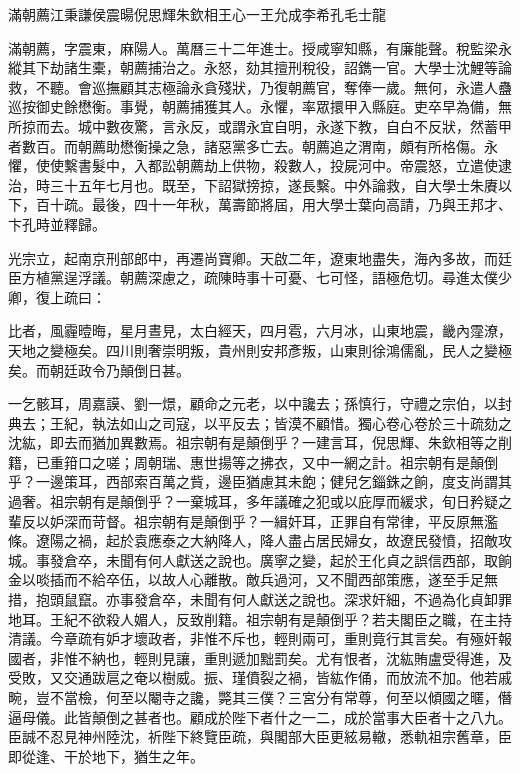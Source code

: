 
\begin{pinyinscope}
滿朝薦江秉謙侯震暘倪思輝朱欽相王心一王允成李希孔毛士龍

滿朝薦，字震東，麻陽人。萬曆三十二年進士。授咸寧知縣，有廉能聲。稅監梁永縱其下劫諸生橐，朝薦捕治之。永怒，劾其擅刑稅役，詔鐫一官。大學士沈鯉等論救，不聽。會巡撫顧其志極論永貪殘狀，乃復朝薦官，奪俸一歲。無何，永遣人蠱巡按御史餘懋衡。事覺，朝薦捕獲其人。永懼，率眾擐甲入縣庭。吏卒早為備，無所掠而去。城中數夜驚，言永反，或謂永宜自明，永遂下教，自白不反狀，然蓄甲者數百。而朝薦助懋衡操之急，諸惡黨多亡去。朝薦追之渭南，頗有所格傷。永懼，使使繫書髮中，入都訟朝薦劫上供物，殺數人，投屍河中。帝震怒，立遣使逮治，時三十五年七月也。既至，下詔獄搒掠，遂長繫。中外論救，自大學士朱賡以下，百十疏。最後，四十一年秋，萬壽節將屆，用大學士葉向高請，乃與王邦才、卞孔時並釋歸。

光宗立，起南京刑部郎中，再遷尚寶卿。天啟二年，遼東地盡失，海內多故，而廷臣方植黨逞浮議。朝薦深慮之，疏陳時事十可憂、七可怪，語極危切。尋進太僕少卿，復上疏曰：

比者，風霾曀晦，星月晝見，太白經天，四月雹，六月冰，山東地震，畿內霪潦，天地之變極矣。四川則奢崇明叛，貴州則安邦彥叛，山東則徐鴻儒亂，民人之變極矣。而朝廷政令乃顛倒日甚。

一乞骸耳，周嘉謨、劉一燝，顧命之元老，以中讒去；孫慎行，守禮之宗伯，以封典去；王紀，執法如山之司寇，以平反去；皆漠不顧惜。獨心卷心卷於三十疏劾之沈紘，即去而猶加異數焉。祖宗朝有是顛倒乎？一建言耳，倪思輝、朱欽相等之削籍，已重箝口之嗟；周朝瑞、惠世揚等之拂衣，又中一網之計。祖宗朝有是顛倒乎？一邊策耳，西部索百萬之貲，邊臣猶慮其未飽；健兒乞錙銖之餉，度支尚謂其過奢。祖宗朝有是顛倒乎？一棄城耳，多年議確之犯或以庇厚而緩求，旬日矜疑之輩反以妒深而苛督。祖宗朝有是顛倒乎？一緝奸耳，正罪自有常律，平反原無濫條。遼陽之禍，起於袁應泰之大納降人，降人盡占居民婦女，故遼民發憤，招敵攻城。事發倉卒，未聞有何人獻送之說也。廣寧之變，起於王化貞之誤信西部，取餉金以啖插而不給卒伍，以故人心離散。敵兵過河，又不聞西部策應，遂至手足無措，抱頭鼠竄。亦事發倉卒，未聞有何人獻送之說也。深求奸細，不過為化貞卸罪地耳。王紀不欲殺人媚人，反致削籍。祖宗朝有是顛倒乎？若夫閣臣之職，在主持清議。今章疏有妒才壞政者，非惟不斥也，輕則兩可，重則竟行其言矣。有殛奸報國者，非惟不納也，輕則見讓，重則遞加黜罰矣。尤有恨者，沈紘賄盧受得進，及受敗，又交通跋扈之奄以樹威。振、瑾僨裂之禍，皆紘作俑，而放流不加。他若戚畹，豈不當檢，何至以閹寺之讒，斃其三僕？三宮分有常尊，何至以傾國之暱，僭逼母儀。此皆顛倒之甚者也。顧成於陛下者什之一二，成於當事大臣者十之八九。臣誠不忍見神州陸沈，祈陛下終覽臣疏，與閣部大臣更絃易轍，悉軌祖宗舊章，臣即從逢、干於地下，猶生之年。


\end{pinyinscope}
